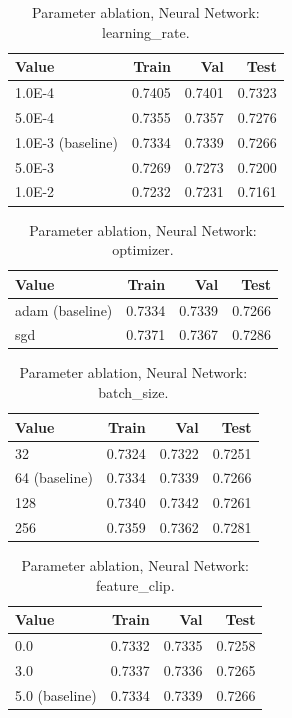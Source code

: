 \begin{table}[ht]
\centering
\small
\caption{Parameter ablation, Neural Network: learning\_rate.}
\label{tab:ablation-neural-learning-rate}
\begin{tabular}{lrrr}
\toprule
Value & Train & Val & Test \\
\midrule
1.0E-4 & 0.7405 & 0.7401 & 0.7323 \\
5.0E-4 & 0.7355 & 0.7357 & 0.7276 \\
1.0E-3 (baseline) & 0.7334 & 0.7339 & 0.7266 \\
5.0E-3 & 0.7269 & 0.7273 & 0.7200 \\
1.0E-2 & 0.7232 & 0.7231 & 0.7161 \\
\bottomrule
\end{tabular}
\end{table}

\begin{table}[ht]
\centering
\small
\caption{Parameter ablation, Neural Network: optimizer.}
\label{tab:ablation-neural-optimizer}
\begin{tabular}{lrrr}
\toprule
Value & Train & Val & Test \\
\midrule
adam (baseline) & 0.7334 & 0.7339 & 0.7266 \\
sgd & 0.7371 & 0.7367 & 0.7286 \\
\bottomrule
\end{tabular}
\end{table}

\begin{table}[ht]
\centering
\small
\caption{Parameter ablation, Neural Network: batch\_size.}
\label{tab:ablation-neural-batch-size}
\begin{tabular}{lrrr}
\toprule
Value & Train & Val & Test \\
\midrule
32 & 0.7324 & 0.7322 & 0.7251 \\
64 (baseline) & 0.7334 & 0.7339 & 0.7266 \\
128 & 0.7340 & 0.7342 & 0.7261 \\
256 & 0.7359 & 0.7362 & 0.7281 \\
\bottomrule
\end{tabular}
\end{table}

\begin{table}[ht]
\centering
\small
\caption{Parameter ablation, Neural Network: feature\_clip.}
\label{tab:ablation-neural-feature-clip}
\begin{tabular}{lrrr}
\toprule
Value & Train & Val & Test \\
\midrule
0.0 & 0.7332 & 0.7335 & 0.7258 \\
3.0 & 0.7337 & 0.7336 & 0.7265 \\
5.0 (baseline) & 0.7334 & 0.7339 & 0.7266 \\
\bottomrule
\end{tabular}
\end{table}

